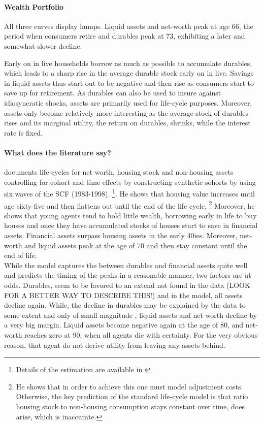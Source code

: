 \documentclass[a4paper,12pt,legno]{article}
\begin{document}
\paragraph{Wealth Portfolio} All three curves display humps. Liquid assets and net-worth peak at age 66, the period when consumers retire and durables peak at 73, exhibiting a later and somewhat slower decline. 

Early on in live households borrow as much as possible to accumulate durables, which leads to a sharp rise in the average durable stock early on in live. Savings in liquid assets thus start out to be negative and then rise as consumers start to save up for retirement. As durables can also be used to insure against idiosyncratic shocks, assets are primarily used for life-cycle purposes. Moreover, assets only become relatively more interesting as the average stock of durables rises and its marginal utility, the return on durables, shrinks, while the interest rate is fixed. 

\paragraph{What does the literature say?} \cite{yang2009} documents life-cycles for net worth, housing stock and non-housing assets controlling for cohort and time effects by constructing synthetic sohorts by using six waves of the SCF (1983-1998). \footnote{Details of the estimation are available in \cite{yang2009}}. He shows that housing value increases until age sixty-five and then flattens out until the end of the life cycle. \footnote{He shows that in order to achieve this one must model adjustment costs. Otherwise, the key prediction of the standard life-cycle model is that ratio housing stock to non-housing consumption stays constant over time, does arise, which is inaccurate. } Moreover, he shows that young agents tend to hold little wealth, borrowing early in life to buy houses and once they have accumulated stocks of houses start to save in financial assets. Financial assets surpass housing assets in the early 40ies. Moreover, net-worth and liquid assets peak at the age of 70 and then stay constant until the end of life. \\

While the model captures the between durables and financial assets quite well and predicts the timing of the peaks in a reasonable manner, two factors are at odds. Durables, seem to be favored to an extend not found in the data (LOOK FOR A BETTER WAY TO DESCRIBE THIS!) and in the model, all assets decline again. While, the decline in durables may be explained by the data to some extent and only of small magnitude \citep{FV&K2011}, liquid assets and net worth decline by a very big margin. Liquid assets become negative again at the age of 80, and net-worth reaches zero at 90, when all agents die with certainty. For the very obvious reason, that agent do not derive utility from leaving any assets behind.  
\end{document}
